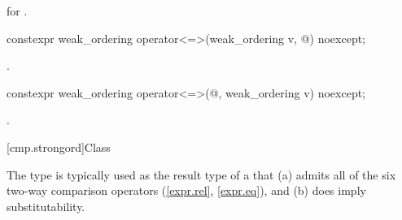 \begin{itemdescr}
\pnum
\returns
{} for .
\end{itemdescr}

%
\begin{itemdecl}
constexpr weak_ordering operator<=>(weak_ordering v, @\unspec@) noexcept;
\end{itemdecl}

\begin{itemdescr}
\pnum
\returns
{}.
\end{itemdescr}

%
\begin{itemdecl}
constexpr weak_ordering operator<=>(@\unspec@, weak_ordering v) noexcept;
\end{itemdecl}

\begin{itemdescr}
\pnum
\returns
{}.
\end{itemdescr}

[cmp.strongord]{Class }

\pnum
The  type is typically used
as the result type of a 
that (a) admits all of the six two-way comparison operators (\ref{expr.rel}, \ref{expr.eq}),
and (b) does imply substitutability.

